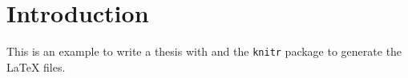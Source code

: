 \section{Introduction}
\label{sec:introduction}

This is an example to write a thesis with \R{} and the \texttt{knitr} package to generate the \LaTeX{} files.